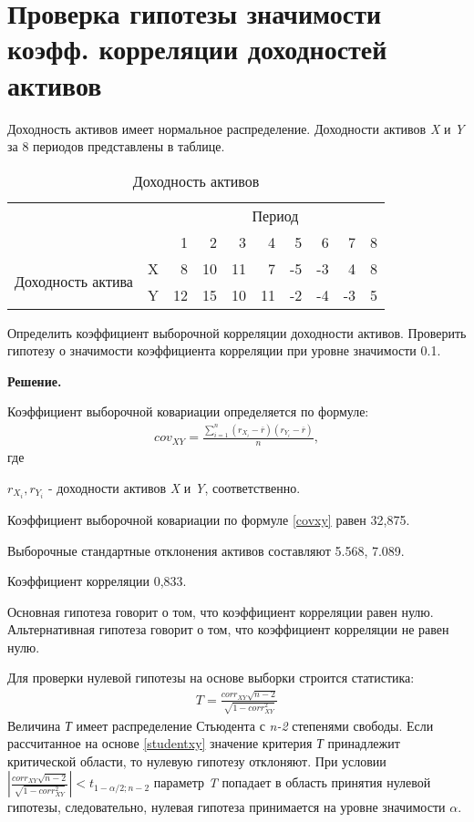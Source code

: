 \documentclass[12pt,a4paper]{article}
\begin{document}
\section{Проверка гипотезы значимости коэфф. корреляции доходностей активов}
\begin{taskrus}
\label{task_sign_corrXY}
Доходность активов имеет нормальное распределение. Доходности активов \textit{X} и \textit{Y} за 8 периодов представлены в таблице.
 \begin{table}[H]
   \centering
   \caption{Доходность активов}
     \begin{tabular}{lcrrrrrrrr}
     \toprule
     \multicolumn{2}{c}{\multirow{2}[1]{*}{}} & \multicolumn{8}{c}{Период} \\ \cmidrule{3-10}
     \multicolumn{2}{c}{} & 1 & 2 & 3 & 4 & 5 & 6 & 7 & 8 \\
     \midrule
     \multicolumn{1}{l}{\multirow{2}[1]{*}{Доходность актива}} & X & 8 & 10 & 11 & 7 & -5 & -3 & 4 & 8 \\
     \multicolumn{1}{l}{} & Y & 12 & 15 & 10 & 11 & -2 & -4 & -3 & 5 \\
     \bottomrule
     \end{tabular}%
   \label{tab:addlabel}%
 \end{table}%


Определить коэффициент выборочной корреляции доходности активов. Проверить гипотезу о значимости коэффициента корреляции при уровне значимости 0.1.

\textbf{Решение.}

Коэффициент выборочной ковариации определяется по формуле:
\begin{align}
\label{covxy}
cov_{XY}=\frac{\sum_{i=1}^n \left(r_{X_i}-\overline{r} \right)\left(r_{Y_i}-\overline{r} \right)}{n},
\end{align}
где 

$r_{X_i}, r_{Y_i}$ - доходности активов \textit{X} и \textit{Y}, соответственно.

Коэффициент выборочной ковариации по формуле \eqref{covxy} равен 32,875.

Выборочные стандартные отклонения активов составляют 5.568, 7.089.

Коэффициент корреляции 0,833.

Основная гипотеза говорит о том, что коэффициент корреляции равен нулю. Альтернативная гипотеза говорит о том, что коэффициент корреляции не равен нулю.

Для проверки нулевой гипотезы на основе выборки строится статистика:
\begin{align}
\label{studentxy}
T=\frac{corr_{XY}\sqrt{n-2}}{\sqrt{1-corr_{XY}^2}}
\end{align}
Величина \textit{Т} имеет распределение Стьюдента с \textit{n-2} степенями свободы. Если рассчитанное на основе \eqref{studentxy} значение критерия \textit{Т }принадлежит критической области, то нулевую гипотезу отклоняют. 
При условии $\left|\frac{corr_{XY}\sqrt{n-2}}{\sqrt{1-corr_{XY}^2}}\right|<t_{1-\alpha/2;n-2}$ параметр \textit{T} попадает в область принятия нулевой гипотезы, следовательно, нулевая гипотеза принимается на уровне значимости $\alpha$.


\end{taskrus}
\end{document}

